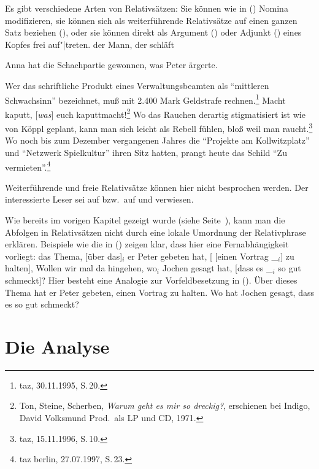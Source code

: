 {\noindent
Es gibt verschiedene Arten von Relativsätzen: Sie können wie in () Nomina modifizieren,
sie können sich als weiterführende Relativsätze auf einen ganzen Satz beziehen (), oder sie
können direkt als Argument () oder Adjunkt () eines Kopfes
frei auf"|treten.
\ea
der Mann, der schläft
\z

\ea
Anna hat die Schachpartie gewonnen, was Peter ärgerte.
\z                                              

\eal
\label{bsp-frei-rs-subj}
\ex Wer das schriftliche Produkt eines Verwaltungsbeamten 
      als "`mittleren Schwachsinn"' bezeichnet,
      muß mit 2.400 Mark Geldstrafe rechnen.\footnote{
        taz, 30.11.1995, S.\,20.}
\ex Macht kaputt, [\emph{was}] euch kaputtmacht!\footnote{
        Ton, Steine, Scherben, \emph{Warum geht es mir so dreckig?}, erschienen bei Indigo, David Volksmund Prod.\ als LP und CD, 1971.
      }
\zl
\eal
\label{bsp-frei-rs-mod}
\ex Wo das Rauchen derartig stigmatisiert ist wie von Köppl geplant, 
      kann man sich leicht als Rebell fühlen, bloß weil man raucht.\footnote{
	taz, 15.11.1996, S.\,10.
}\label{bsp-rauchen-stigmatisiert}
\ex Wo noch bis zum Dezember vergangenen Jahres die "`Projekte am Kollwitzplatz"' und
      "`Netzwerk Spielkultur"' ihren Sitz hatten, prangt heute das Schild "`Zu vermieten"'.\footnote{
        taz berlin, 27.07.1997, S.\,23.
        }
\zl
}%

\noindent
Weiterführende und freie Relativsätze können hier nicht besprochen werden. Der interessierte Leser
sei auf  bzw.\ auf  und  verwiesen.

Wie bereits im vorigen Kapitel gezeigt wurde (siehe Seite~\pageref{bsp-nla-rs}), 
kann man die Abfolgen in Relativsätzen nicht durch
eine lokale Umordnung der Relativphrase erklären. Beispiele wie die in () zeigen
klar, dass hier eine Fernabhängigkeit vorliegt:
\ea
das Thema, [über das]$_i$ er Peter gebeten hat, [ [einen Vortrag \_$_i$] zu halten],
\z
\ea
Wollen wir mal da hingehen, wo$_i$ Jochen gesagt hat, [dass es \_$_i$ so gut schmeckt]?
\z
Hier besteht eine Analogie zur Vorfeldbesetzung in ().
\eal
\ex Über dieses Thema hat er Peter gebeten, einen Vortrag zu halten.
\ex Wo hat Jochen gesagt, dass es so gut schmeckt?
\zl



\section{Die Analyse}
\label{sec-rs-anal}

